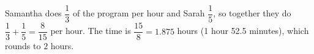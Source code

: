 Samantha does $\dfrac{1}{3}$ of the program per hour and Sarah $\dfrac{1}{5}$, so together they do $\dfrac{1}{3}+\dfrac{1}{5}=\dfrac{8}{15}$ per hour. The time is $\dfrac{15}{8}=1.875$ hours (1 hour 52.5 minutes), which rounds to $\boxed{2}$ hours.
